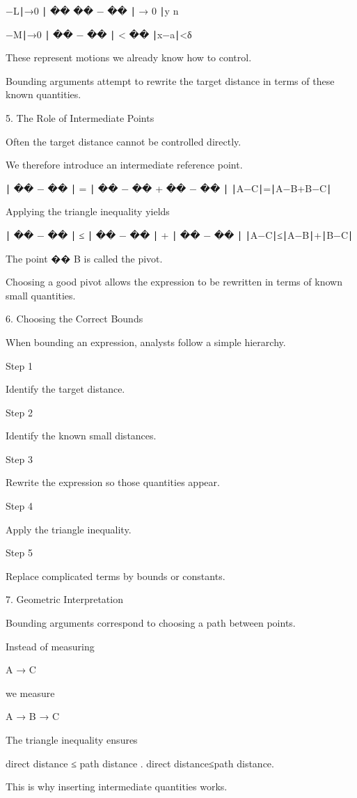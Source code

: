 −L∣→0
∣
��
��
−
��
∣
→
0
∣y
n
	​

−M∣→0
∣
��
−
��
∣
<
��
∣x−a∣<δ

These represent motions we already know how to control.

Bounding arguments attempt to rewrite the target distance in terms of these known quantities.

5. The Role of Intermediate Points

Often the target distance cannot be controlled directly.

We therefore introduce an intermediate reference point.

∣
��
−
��
∣
=
∣
��
−
��
+
��
−
��
∣
∣A−C∣=∣A−B+B−C∣

Applying the triangle inequality yields

∣
��
−
��
∣
≤
∣
��
−
��
∣
+
∣
��
−
��
∣
∣A−C∣≤∣A−B∣+∣B−C∣

The point 
��
B is called the pivot.

Choosing a good pivot allows the expression to be rewritten in terms of known small quantities.

6. Choosing the Correct Bounds

When bounding an expression, analysts follow a simple hierarchy.

Step 1

Identify the target distance.

Step 2

Identify the known small distances.

Step 3

Rewrite the expression so those quantities appear.

Step 4

Apply the triangle inequality.

Step 5

Replace complicated terms by bounds or constants.

7. Geometric Interpretation

Bounding arguments correspond to choosing a path between points.

Instead of measuring

A → C

we measure

A → B → C

The triangle inequality ensures

direct distance
≤
path distance
.
direct distance≤path distance.

This is why inserting intermediate quantities works.

